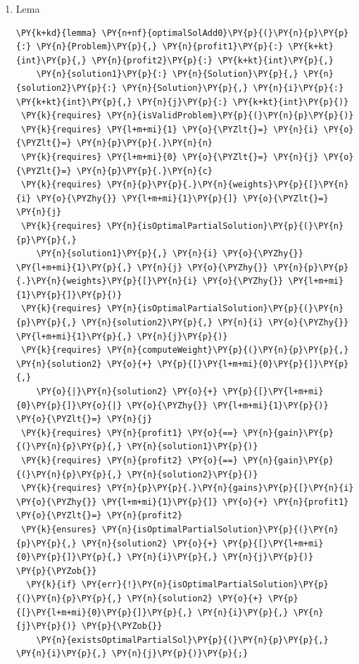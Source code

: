\begin{sloppypar}
\begin{enumerate}
     \item Lema 
     \begin{Verbatim}[commandchars=\\\{\}]
\PY{k+kd}{lemma} \PY{n+nf}{optimalSolAdd0}\PY{p}{(}\PY{n}{p}\PY{p}{:} \PY{n}{Problem}\PY{p}{,} \PY{n}{profit1}\PY{p}{:} \PY{k+kt}{int}\PY{p}{,} \PY{n}{profit2}\PY{p}{:} \PY{k+kt}{int}\PY{p}{,} 
    \PY{n}{solution1}\PY{p}{:} \PY{n}{Solution}\PY{p}{,} \PY{n}{solution2}\PY{p}{:} \PY{n}{Solution}\PY{p}{,} \PY{n}{i}\PY{p}{:} \PY{k+kt}{int}\PY{p}{,} \PY{n}{j}\PY{p}{:} \PY{k+kt}{int}\PY{p}{)}
 \PY{k}{requires} \PY{n}{isValidProblem}\PY{p}{(}\PY{n}{p}\PY{p}{)}
 \PY{k}{requires} \PY{l+m+mi}{1} \PY{o}{\PYZlt{}=} \PY{n}{i} \PY{o}{\PYZlt{}=} \PY{n}{p}\PY{p}{.}\PY{n}{n}
 \PY{k}{requires} \PY{l+m+mi}{0} \PY{o}{\PYZlt{}=} \PY{n}{j} \PY{o}{\PYZlt{}=} \PY{n}{p}\PY{p}{.}\PY{n}{c}
 \PY{k}{requires} \PY{n}{p}\PY{p}{.}\PY{n}{weights}\PY{p}{[}\PY{n}{i} \PY{o}{\PYZhy{}} \PY{l+m+mi}{1}\PY{p}{]} \PY{o}{\PYZlt{}=} \PY{n}{j}
 \PY{k}{requires} \PY{n}{isOptimalPartialSolution}\PY{p}{(}\PY{n}{p}\PY{p}{,} 
    \PY{n}{solution1}\PY{p}{,} \PY{n}{i} \PY{o}{\PYZhy{}} \PY{l+m+mi}{1}\PY{p}{,} \PY{n}{j} \PY{o}{\PYZhy{}} \PY{n}{p}\PY{p}{.}\PY{n}{weights}\PY{p}{[}\PY{n}{i} \PY{o}{\PYZhy{}} \PY{l+m+mi}{1}\PY{p}{]}\PY{p}{)}
 \PY{k}{requires} \PY{n}{isOptimalPartialSolution}\PY{p}{(}\PY{n}{p}\PY{p}{,} \PY{n}{solution2}\PY{p}{,} \PY{n}{i} \PY{o}{\PYZhy{}} \PY{l+m+mi}{1}\PY{p}{,} \PY{n}{j}\PY{p}{)}
 \PY{k}{requires} \PY{n}{computeWeight}\PY{p}{(}\PY{n}{p}\PY{p}{,} \PY{n}{solution2} \PY{o}{+} \PY{p}{[}\PY{l+m+mi}{0}\PY{p}{]}\PY{p}{,} 
    \PY{o}{|}\PY{n}{solution2} \PY{o}{+} \PY{p}{[}\PY{l+m+mi}{0}\PY{p}{]}\PY{o}{|} \PY{o}{\PYZhy{}} \PY{l+m+mi}{1}\PY{p}{)} \PY{o}{\PYZlt{}=} \PY{n}{j}
 \PY{k}{requires} \PY{n}{profit1} \PY{o}{==} \PY{n}{gain}\PY{p}{(}\PY{n}{p}\PY{p}{,} \PY{n}{solution1}\PY{p}{)}
 \PY{k}{requires} \PY{n}{profit2} \PY{o}{==} \PY{n}{gain}\PY{p}{(}\PY{n}{p}\PY{p}{,} \PY{n}{solution2}\PY{p}{)}
 \PY{k}{requires} \PY{n}{p}\PY{p}{.}\PY{n}{gains}\PY{p}{[}\PY{n}{i} \PY{o}{\PYZhy{}} \PY{l+m+mi}{1}\PY{p}{]} \PY{o}{+} \PY{n}{profit1} \PY{o}{\PYZlt{}=} \PY{n}{profit2}
 \PY{k}{ensures} \PY{n}{isOptimalPartialSolution}\PY{p}{(}\PY{n}{p}\PY{p}{,} \PY{n}{solution2} \PY{o}{+} \PY{p}{[}\PY{l+m+mi}{0}\PY{p}{]}\PY{p}{,} \PY{n}{i}\PY{p}{,} \PY{n}{j}\PY{p}{)}
\PY{p}{\PYZob{}}
  \PY{k}{if} \PY{err}{!}\PY{n}{isOptimalPartialSolution}\PY{p}{(}\PY{n}{p}\PY{p}{,} \PY{n}{solution2} \PY{o}{+} \PY{p}{[}\PY{l+m+mi}{0}\PY{p}{]}\PY{p}{,} \PY{n}{i}\PY{p}{,} \PY{n}{j}\PY{p}{)} \PY{p}{\PYZob{}}
    \PY{n}{existsOptimalPartialSol}\PY{p}{(}\PY{n}{p}\PY{p}{,} \PY{n}{i}\PY{p}{,} \PY{n}{j}\PY{p}{)}\PY{p}{;}

\end{Verbatim}
\end{enumerate}
\end{sloppypar}
